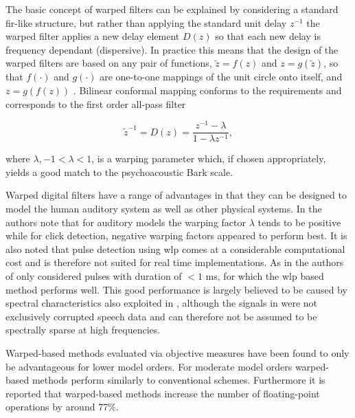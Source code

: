 The basic concept of warped filters can be explained by considering a standard \gls{fir}-like structure, but rather than applying the standard unit delay $z^{-1}$ the warped filter applies a new delay element $D(z)$ so that each new delay is frequency dependant (dispersive). In practice this means that the design of the warped filters are based on any pair of functions, $\tilde{z} = f(z)$ and $z = g(\tilde{z})$, so that $f(\cdot)$ and $g(\cdot)$ are one-to-one mappings of the unit circle onto itself, and $z = g\left( f(z) \right)$ \cite{Karjalainen1997}. Bilinear conformal mapping\cite{Brown1996} conforms to the requirements and corresponds to the first order all-pass filter

\begin{equation}\label{eq:Karjalainen1997}
\tilde{z}^{-1} = D(z) = \frac{z^{-1} - \lambda}{1 - \lambda z^{-1}},
\end{equation}

where $\lambda, -1 < \lambda < 1$, is a warping parameter which, if chosen appropriately\cite{Karjalainen1997}, yields a good match to the psychoacoustic Bark scale\cite{Smith1995}.

Warped digital filters have a range of advantages in that they can be designed to model the human auditory system as well as other physical systems\cite{Karjalainen1997}. In \cite{Esquef2002} the authors note that for auditory models the warping factor $\lambda$ tends to be positive while for click detection, negative warping factors appeared to perform best. It is also noted that pulse detection using \gls{wlp} comes at a considerable computational cost and is therefore not suited for real time implementations. As in \cite{Godsill1998book} the authors of \cite{Esquef2002} only considered pulses with duration of $<1$ ms, for which the \gls{wlp} based method performs well. This good performance is largely believed to be caused by spectral characteristics also exploited in \cite{Kasparis1993}\cite{US6795559}, although the signals in \cite{Esquef2002} were not exclusively corrupted speech data and can therefore not be assumed to be spectrally sparse at high frequencies.



Warped-based methods evaluated via objective measures have been found to only be advantageous for lower model orders. For moderate model orders warped-based methods perform similarly to conventional schemes\cite{Esquef2003}\cite{Esquef2003a}. Furthermore it is reported that warped-based methods increase the number of floating-point operations by around 77\%\cite{Esquef2003}.

